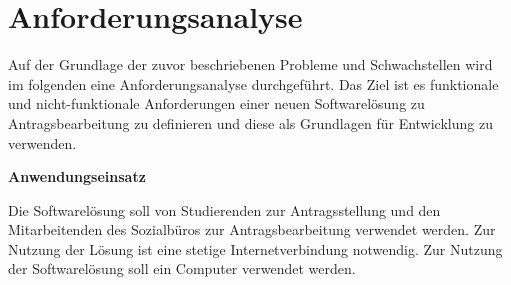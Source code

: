 
\section{Anforderungsanalyse}\label{sec:Anforderungsanalyse}
Auf der Grundlage der zuvor beschriebenen Probleme und Schwachstellen wird im folgenden eine Anforderungsanalyse durchgeführt. Das Ziel ist es funktionale und nicht-funktionale Anforderungen einer neuen Softwarelösung zu Antragsbearbeitung zu definieren und diese als Grundlagen für Entwicklung zu verwenden. 

\textbf{Anwendungseinsatz}

Die Softwarelösung soll von Studierenden zur Antragsstellung und den Mitarbeitenden des Sozialbüros zur Antragsbearbeitung verwendet werden. Zur Nutzung der Lösung ist eine stetige Internetverbindung notwendig. Zur Nutzung der Softwarelösung soll ein Computer verwendet werden.  


